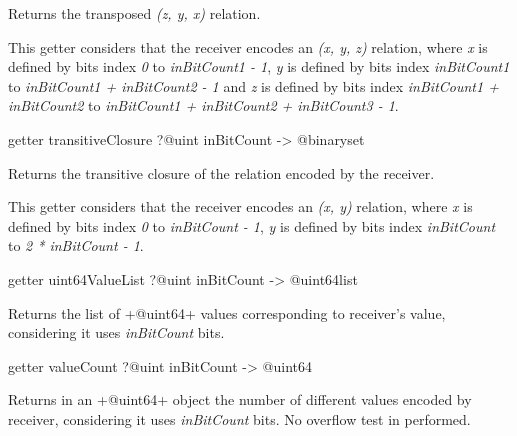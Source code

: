 Returns the transposed \emph{(z, y, x)} relation.

This getter considers that the receiver encodes an \emph{(x, y, z)} relation, where \emph{x} is defined by bits index \emph{0} to \emph{inBitCount1  - 1}, \emph{y} is defined by bits index \emph{inBitCount1} to \emph{inBitCount1 + inBitCount2 - 1} and  \emph{z} is defined by bits index \emph{inBitCount1 + inBitCount2} to \emph{inBitCount1 + inBitCount2 + inBitCount3 - 1}.









\begin{galgasbox}
getter transitiveClosure ?@uint inBitCount -> @binaryset
\end{galgasbox}


Returns the transitive closure of the relation encoded by the receiver.

This getter considers that the receiver encodes an \emph{(x, y)} relation, where \emph{x} is defined by bits index \emph{0} to \emph{inBitCount  - 1}, \emph{y} is defined by bits index \emph{inBitCount} to \emph{2 * inBitCount - 1}.









\begin{galgasbox}
getter uint64ValueList ?@uint inBitCount -> @uint64list
\end{galgasbox}


Returns the list of \ggs+@uint64+ values corresponding to receiver's value, considering it uses \emph{inBitCount} bits.









\begin{galgasbox}
getter valueCount ?@uint inBitCount -> @uint64
\end{galgasbox}


Returns in an \ggs+@uint64+ object the number of different values encoded by receiver, considering it uses \emph{inBitCount} bits. No overflow test in performed.







